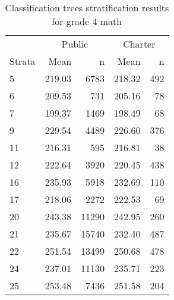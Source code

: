 \begin{table}[ht]
\centering
\caption{Classification trees stratification results for grade 4 math} 
\label{g4math-circpsa-tree}
\begin{tabular}{lrr@{\extracolsep{.2cm}}rr}
  \hline
   & \multicolumn{2}{c}{Public} & \multicolumn{2}{c}{Charter} \\ \cline{2-3} \cline{4-5} Strata & Mean & n & Mean & n \\ \hline
5 & 219.03 & 6783 & 218.32 & 492 \\ 
  6 & 209.53 & 731 & 205.16 &  78 \\ 
  7 & 199.37 & 1469 & 198.49 &  68 \\ 
  9 & 229.54 & 4489 & 226.60 & 376 \\ 
  11 & 216.31 & 595 & 216.81 &  38 \\ 
  12 & 222.64 & 3920 & 220.45 & 438 \\ 
  16 & 235.93 & 5918 & 232.69 & 110 \\ 
  17 & 218.06 & 2272 & 222.53 &  69 \\ 
  20 & 243.38 & 11290 & 242.95 & 260 \\ 
  21 & 235.67 & 15740 & 232.40 & 487 \\ 
  22 & 251.54 & 13499 & 250.68 & 478 \\ 
  24 & 237.01 & 11130 & 235.71 & 223 \\ 
  25 & 253.48 & 7436 & 251.58 & 204 \\ 
   \hline
\end{tabular}
\end{table}
